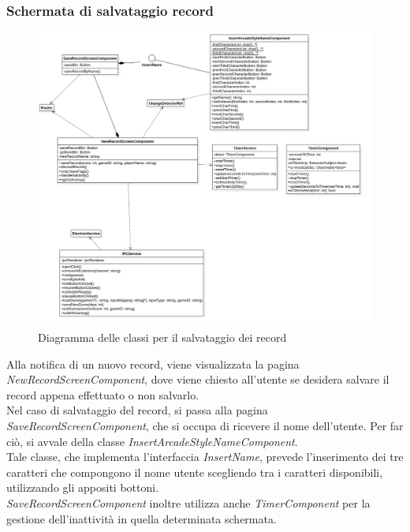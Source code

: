 \subsubsection{Schermata di salvataggio record}
\begin{figure}[h]
    \centering
    \includegraphics[width=340pt]{ProgettazioneTecnica/NewRecord.png}
    \caption{Diagramma delle classi per il salvataggio dei record}
    \label{fig:attore}
\end{figure}
Alla notifica di un nuovo record, viene visualizzata la pagina \emph{NewRecordScreenComponent}, dove viene chiesto all'utente se desidera salvare il record appena effettuato o non salvarlo.\\
Nel caso di salvataggio del record, si passa alla pagina \emph{SaveRecordScreenComponent}, che si occupa di ricevere il nome dell'utente. Per far ciò, si avvale della classe \emph{InsertArcadeStyleNameComponent}.\\
Tale classe, che implementa l'interfaccia \emph{InsertName}, prevede l'inserimento dei tre caratteri che compongono il nome utente scegliendo tra i caratteri disponibili, utilizzando gli appositi bottoni.\\
\emph{SaveRecordScreenComponent} inoltre utilizza anche \emph{TimerComponent} per la gestione dell'inattività in quella determinata schermata.
